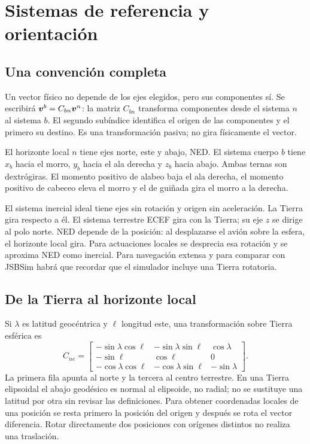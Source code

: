 \chapter{Sistemas de referencia y orientación}\label{ch:ejes}

\section{Una convención completa}
Un vector físico no depende de los ejes elegidos, pero sus componentes sí. Se escribirá $\boldsymbol{v}^b=C_{bn}\boldsymbol{v}^n$: la matriz $C_{bn}$ transforma componentes desde el sistema $n$ al sistema $b$. El segundo subíndice identifica el origen de las componentes y el primero su destino. Es una transformación pasiva; no gira físicamente el vector.

El horizonte local $n$ tiene ejes norte, este y abajo, NED. El sistema cuerpo $b$ tiene $x_b$ hacia el morro, $y_b$ hacia el ala derecha y $z_b$ hacia abajo. Ambas ternas son dextrógiras. El momento positivo de alabeo baja el ala derecha, el momento positivo de cabeceo eleva el morro y el de guiñada gira el morro a la derecha.

El sistema inercial ideal tiene ejes sin rotación y origen sin aceleración. La Tierra gira respecto a él. El sistema terrestre ECEF gira con la Tierra; su eje $z$ se dirige al polo norte. NED depende de la posición: al desplazarse el avión sobre la esfera, el horizonte local gira. Para actuaciones locales se desprecia esa rotación y se aproxima NED como inercial. Para navegación extensa y para comparar con JSBSim habrá que recordar que el simulador incluye una Tierra rotatoria.

\section{De la Tierra al horizonte local}
Si $\lambda$ es latitud geocéntrica y $\ell$ longitud este, una transformación sobre Tierra esférica es
\begin{equation}
C_{ne}=\begin{bmatrix}
-\sin\lambda\cos\ell&-\sin\lambda\sin\ell&\cos\lambda\\
-\sin\ell&\cos\ell&0\\
-\cos\lambda\cos\ell&-\cos\lambda\sin\ell&-\sin\lambda
\end{bmatrix}.
\end{equation}
La primera fila apunta al norte y la tercera al centro terrestre. En una Tierra elipsoidal el abajo geodésico es normal al elipsoide, no radial; no se sustituye una latitud por otra sin revisar las definiciones. Para obtener coordenadas locales de una posición se resta primero la posición del origen y después se rota el vector diferencia. Rotar directamente dos posiciones con orígenes distintos no realiza una traslación.

